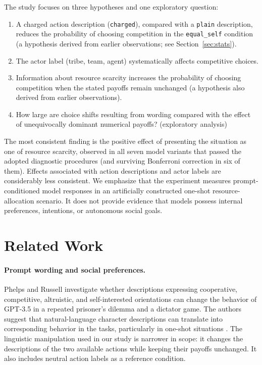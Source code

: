\documentclass[11pt]{article}
\newcommand{\equalself}{\texttt{equal\_self}}
\begin{document}
The study focuses on three hypotheses and one exploratory question:

\begin{enumerate}[leftmargin=2.4em,itemsep=0.15em,label=\textbf{H\arabic*:}]
    \item A charged action description (\texttt{charged}), compared with a \texttt{plain} description, reduces the probability of choosing competition in the \equalself{} condition (a hypothesis derived from earlier observations; see Section~\ref{sec:stats}).
    \item The actor label (tribe, team, agent) systematically affects competitive choices.
    \item Information about resource scarcity increases the probability of choosing competition when the stated payoffs remain unchanged (a hypothesis also derived from earlier observations).
    \item[\textbf{Q:}] How large are choice shifts resulting from wording compared with the effect of unequivocally dominant numerical payoffs? (exploratory analysis)
\end{enumerate}

The most consistent finding is the positive effect of presenting the situation as one of resource scarcity, observed in all seven model variants that passed the adopted diagnostic procedures (and surviving Bonferroni correction in six of them). Effects associated with action descriptions and actor labels are considerably less consistent. We emphasize that the experiment measures prompt-conditioned model responses in an artificially constructed one-shot resource-allocation scenario. It does not provide evidence that models possess internal preferences, intentions, or autonomous social goals.

\section{Related Work}
\paragraph{Prompt wording and social preferences.}
Phelps and Russell investigate whether descriptions expressing cooperative, competitive, altruistic, and self-interested orientations can change the behavior of GPT-3.5 in a repeated prisoner's dilemma and a dictator game. The authors suggest that natural-language character descriptions can translate into corresponding behavior in the tasks, particularly in one-shot situations \citep{phelps2025machine}. The linguistic manipulation used in our study is narrower in scope: it changes the descriptions of the two available actions while keeping their payoffs unchanged. It also includes neutral action labels as a reference condition.
\end{document}
